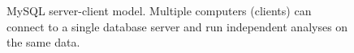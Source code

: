 \begin{figure}[h]
\centering
\def\svgwidth{0.7\textwidth}

\caption[MySQL server-client model]{MySQL server-client model. Multiple
computers (clients) can connect to a single database server and run independent
analyses on the same data.}
\label{fig:server-client}
\end{figure}
